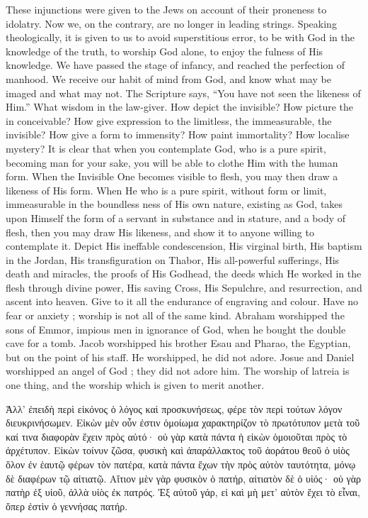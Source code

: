 \documentclass[10pt]{book}
\newcommand{\switchGreek}[1][]{\selectlanguage{polutonikogreek} \switchcolumn*[#1]}
\begin{document}
\begin{paracol}{2}
These injunctions were given to the Jews on 
account of their proneness to idolatry. Now 
we, on the contrary, are no longer in leading 
strings. Speaking theologically, it is given to 
us to avoid superstitious error, to be with God 
in the knowledge of the truth, to worship God 
alone, to enjoy the fulness of His knowledge. 
We have passed the stage of infancy, and 
reached the perfection of manhood. We receive 
our habit of mind from God, and know what 
may be imaged and what may not. The 
Scripture says, ``You have not seen the likeness 
of Him.'' What wisdom in the law-giver. How 
depict the invisible? How picture the in 
conceivable? How give expression to the 
limitless, the immeasurable, the invisible? 
How give a form to immensity? How paint 
immortality? How localise mystery? It is 
clear that when you contemplate God, who is 
a pure spirit, becoming man for your sake, 
you will be able to clothe Him with the human 
form. When the Invisible One becomes visible 
to flesh, you may then draw a likeness of His 
form. When He who is a pure spirit, without 
form or limit, immeasurable in the boundless 
ness of His own nature, existing as God, takes 
upon Himself the form of a servant in substance 
and in stature, and a body of flesh, then you 
may draw His likeness, and show it to anyone 
willing to contemplate it. Depict His ineffable 
condescension, His virginal birth, His baptism 
in the Jordan, His transfiguration on Thabor, 
His all-powerful sufferings, His death and 
miracles, the proofs of His Godhead, the deeds 
which He worked in the flesh through divine 
power, His saving Cross, His Sepulchre, and 
resurrection, and ascent into heaven. Give to 
it all the endurance of engraving and colour. 
Have no fear or anxiety ; worship is not all of 
the same kind. Abraham worshipped the sons 
of Emmor, impious men in ignorance of God, 
when he bought the double cave for a tomb. 
Jacob worshipped his brother Esau and Pharao, 
the Egyptian, but on the point of his staff.
He worshipped, he did not adore. Josue and 
Daniel worshipped an angel of God ; they did 
not adore him. The worship of latreia is one 
thing, and the worship which is given to merit 
another.

\switchGreek

Ἀλλ’ ἐπειδὴ περὶ εἰκόνος ὁ λόγος καὶ προσκυνήσεως, φέρε τὸν περὶ τούτων λόγον διευκρινήσωμεν. Εἰκὼν μὲν οὖν ἐστιν ὁμοίωμα χαρακτηρίζον τὸ πρωτότυπον μετὰ τοῦ καί τινα διαφορὰν ἔχειν πρὸς αὐτό· οὐ γὰρ κατὰ πάντα ἡ εἰκὼν ὁμοιοῦται πρὸς τὸ ἀρχέτυπον. Εἰκὼν τοίνυν ζῶσα, φυσικὴ καὶ ἀπαράλλακτος τοῦ ἀοράτου θεοῦ ὁ υἱὸς ὅλον ἐν ἑαυτῷ φέρων τὸν πατέρα, κατὰ πάντα ἔχων τὴν πρὸς αὐτὸν ταυτότητα, μόνῳ δὲ διαφέρων τῷ αἰτιατῷ. Αἴτιον μὲν γὰρ φυσικὸν ὁ πατήρ, αἰτιατὸν δὲ ὁ υἱός· οὐ γὰρ πατὴρ ἐξ υἱοῦ, ἀλλὰ υἱὸς ἐκ πατρός. Ἐξ αὐτοῦ γάρ, εἰ καὶ μὴ μετ’ αὐτὸν ἔχει τὸ εἶναι, ὅπερ ἐστὶν ὁ γεννήσας πατήρ.


\end{paracol}
\end{document}
